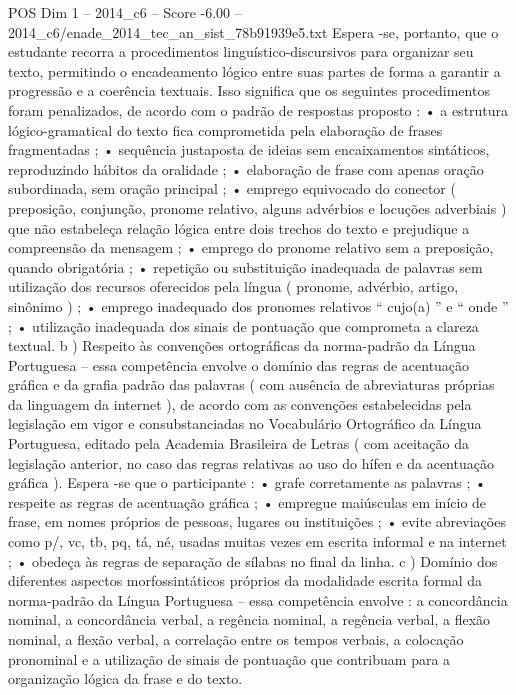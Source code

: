 \begin{textsample}{POS Dim 1 – 2014\_c6 – Score -6.00 – 2014\_c6/enade\_2014\_tec\_an\_sist\_78b91939e5.txt}
Espera -se, portanto, que o estudante recorra a procedimentos linguístico-discursivos para organizar seu texto, permitindo o encadeamento lógico entre suas partes de forma a garantir a progressão e a coerência textuais.
Isso significa que os seguintes procedimentos foram penalizados, de acordo com o padrão de respostas proposto : • a estrutura lógico-gramatical do texto fica comprometida pela elaboração de frases fragmentadas ; • sequência justaposta de ideias sem encaixamentos sintáticos, reproduzindo hábitos da oralidade ; • elaboração de frase com apenas oração subordinada, sem oração principal ; • emprego equivocado do conector ( preposição, conjunção, pronome relativo, alguns advérbios e locuções adverbiais ) que não estabeleça relação lógica entre dois trechos do texto e prejudique a compreensão da mensagem ; • emprego do pronome relativo sem a preposição, quando obrigatória ; • repetição ou substituição inadequada de palavras sem utilização dos recursos oferecidos pela língua ( pronome, advérbio, artigo, sinônimo ) ; • emprego inadequado dos pronomes relativos “ cujo(a) ” e “ onde ” ; • utilização inadequada dos sinais de pontuação que comprometa a clareza textual. b ) Respeito às convenções ortográficas da norma-padrão da Língua Portuguesa – essa competência envolve o domínio das regras de acentuação gráfica e da grafia padrão das palavras ( com ausência de abreviaturas próprias da linguagem da internet ), de acordo com as convenções estabelecidas pela legislação em vigor e consubstanciadas no Vocabulário Ortográfico da Língua Portuguesa, editado pela Academia Brasileira de Letras ( com aceitação da legislação anterior, no caso das regras relativas ao uso do hífen e da acentuação gráfica ).
Espera -se que o participante : • grafe corretamente as palavras ; • respeite as regras de acentuação gráfica ; • empregue maiúsculas em início de frase, em nomes próprios de pessoas, lugares ou instituições ; • evite abreviações como p/, vc, tb, pq, tá, né, usadas muitas vezes em escrita informal e na internet ; • obedeça às regras de separação de sílabas no final da linha. c ) Domínio dos diferentes aspectos morfossintáticos próprios da modalidade escrita formal da norma-padrão da Língua Portuguesa – essa competência envolve : a concordância nominal, a concordância verbal, a regência nominal, a regência verbal, a flexão nominal, a flexão verbal, a correlação entre os tempos verbais, a colocação pronominal e a utilização de sinais de pontuação que contribuam para a organização lógica da frase e do texto.

\end{textsample}
